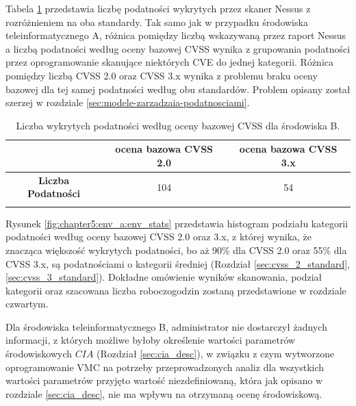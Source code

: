 \bigbreak
Tabela \ref{tab:chapter5:env_b:detected_vulns_nessus} przedstawia liczbę podatności wykrytych przez skaner Nessus z rozróżnieniem na oba standardy. Tak samo jak w przypadku środowiska teleinformatycznego A, różnica pomiędzy liczbą wskazywaną przez raport Nessus a liczbą podatności według oceny bazowej CVSS wynika z grupowania podatności przez oprogramowanie skanujące niektórych CVE do jednej kategorii. Różnica pomiędzy liczbą CVSS 2.0 oraz CVSS 3.x wynika z problemu braku oceny bazowej dla tej samej podatności według obu standardów. Problem opisany został szerzej w rozdziale \ref{sec:modele-zarzadzaia-podatnosciami}.

\begin{table}[tbh]
\caption{Liczba wykrytych podatności według oceny bazowej CVSS dla środowiska B.}
\begin{center}
\label{tab:chapter5:env_b:detected_vulns_nessus}
\begin{tabular}{ccc}
\hline \noalign {\smallskip}
                &  ocena bazowa CVSS 2.0 & ocena bazowa CVSS 3.x\\
\hline \noalign {\smallskip}
\textbf{Liczba Podatności} &      104       & 54    \\
\hline \noalign {\smallskip}
\end{tabular}
\end{center}
\end{table}

\bigbreak
Rysunek \ref{fig:chapter5:env_a:env_stats} przedstawia histogram podziału kategorii podatności według oceny bazowej CVSS 2.0 oraz 3.x, z której wynika, że znacząca większość wykrytych podatności, bo aż 90\% dla CVSS 2.0 oraz 55\% dla CVSS 3.x, są podatnościami o kategorii średniej (Rozdział \ref{sec:cvss_2_standard}, \ref{sec:cvss_3_standard}). Dokładne omówienie wyników skanowania, podział kategorii oraz szacowana liczba roboczogodzin zostaną przedstawione w rozdziale czwartym.

\bigbreak
Dla środowiska teleinformatycznego B, administrator nie dostarczył żadnych informacji, z których możliwe byłoby określenie wartości parametrów środowiskowych $CIA$ (Rozdział \ref{sec:cia_desc}), w związku z czym wytworzone oprogramowanie VMC na potrzeby przeprowadzonych analiz dla wszystkich wartości parametrów przyjęto wartość niezdefiniowaną, która jak opisano w rozdziale \ref{sec:cia_desc}, nie ma wpływu na otrzymaną ocenę środowiskową. 

